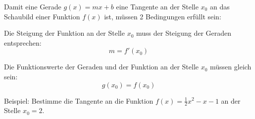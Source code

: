 Damit eine Gerade \(g(x)=mx+b\) eine Tangente an der Stelle \(x_0\) an das Schaubild einer Funktion \(f(x)\) ist, müssen 2 Bedingungen erfüllt sein:
\begin{tcolorbox}

    \bigskip

	\textcolor{loestc}{Die Steigung der Funktion an der Stelle \(x_0\) muss der Steigung der Geraden entsprechen:
		\[m=f'(x_0)\]}
\end{tcolorbox}
\begin{tcolorbox}

    \bigskip

	\textcolor{loestc}{Die Funktionswerte der Geraden und der Funktion an der Stelle \(x_0\) müssen gleich sein:
		\[g(x_0)=f(x_0)\]}
\end{tcolorbox}
Beispiel: Bestimme die Tangente an die Funktion \(f(x)=\frac{1}{2}x^2-x-1\) an der Stelle \(x_0=2\).\vspace{0.5cm}
\begin{minipage}{\textwidth}
\end{minipage}\newpage

